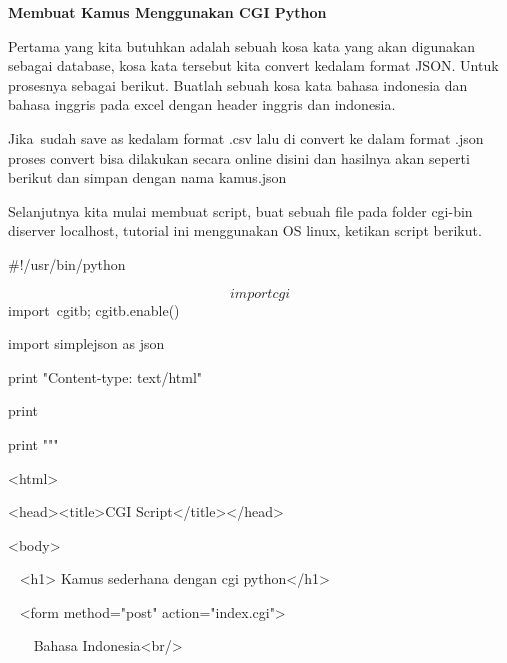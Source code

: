 \par
\vspace{12pt}
\noindent 
\textbf{Membuat Kamus Menggunakan CGI Python} \par
Pertama yang kita butuhkan adalah sebuah kosa kata yang akan digunakan sebagai database, kosa kata tersebut kita convert kedalam format JSON. Untuk prosesnya sebagai berikut. Buatlah sebuah kosa kata bahasa indonesia dan bahasa inggris pada excel dengan header inggris dan indonesia. \par
\vspace{12pt}
Jika~sudah save as kedalam format .csv lalu di convert ke dalam format .json proses convert  bisa dilakukan secara online disini dan hasilnya akan seperti berikut dan simpan dengan nama kamus.json  \par
\vspace{12pt}
\noindent 
Selanjutnya kita mulai membuat script, buat sebuah file pada folder cgi-bin diserver localhost, tutorial ini menggunakan OS linux, ketikan script berikut. \par
\noindent 

$  \#  $!/usr/bin/python \par
\noindent 
\begin{equation}
import cgi
\end{equation}
import~cgitb; cgitb.enable()   \par
\noindent 
import simplejson as json \par
\vspace{12pt}
\noindent 
print "Content-type: text/html" \par
\noindent 
print \par
\vspace{12pt}
\noindent 
print """ \par
\noindent 
<html> \par
\noindent 
<head><title>CGI Script</title></head> \par
\noindent 
<body> \par
\noindent 
~ <h1> Kamus sederhana dengan cgi python</h1> \par
\noindent 
~ <form method="post" action="index.cgi"> \par
\noindent 
~~~ Bahasa Indonesia<br/> \par
\noindent 

